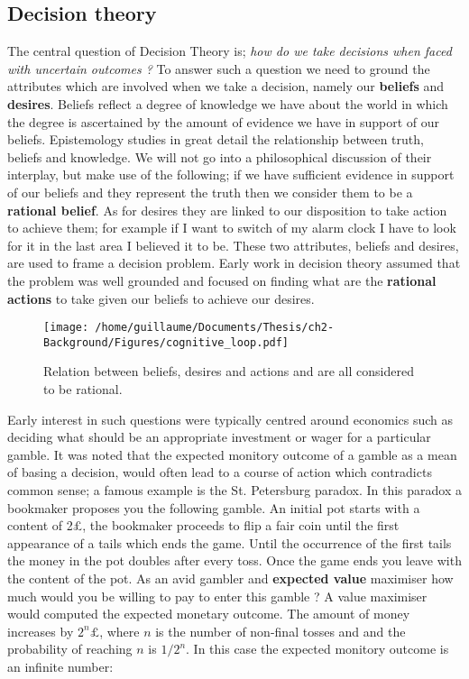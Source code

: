 \subsection{Decision theory}

The central question of Decision Theory is; \textit{how do we take decisions when faced with uncertain outcomes ?} To answer
such a question we need to ground the attributes which are involved when we take a decision, namely our \textbf{beliefs} and 
\textbf{desires}. Beliefs reflect a degree of knowledge we have about the world in which the degree is ascertained by 
the amount of evidence we have in support of our beliefs. Epistemology studies in great detail the relationship between 
truth, beliefs and knowledge. We will not go into a philosophical discussion of their interplay, but make use of the following; 
if we have sufficient evidence in support of our beliefs and they represent the truth then we consider them to 
be a \textbf{rational belief}. As for desires they are linked to our disposition to take action to achieve them; for 
example if I want to switch of my alarm clock I have to look for it in the last area I believed it to be. 
These two attributes, beliefs and desires, are used to frame a decision problem. Early work in decision theory assumed 
that the problem was well grounded and focused on finding what are the \textbf{rational actions} to take given our beliefs 
to achieve our desires. 

\begin{figure}
 \centering
 \texttt{[image: /home/guillaume/Documents/Thesis/ch2-Background/Figures/cognitive\_loop.pdf]}
  \caption{Relation between beliefs, desires and actions and are all considered to be rational.}
\end{figure}

Early interest in such questions were typically centred around economics such as deciding what should be an appropriate 
investment or wager for a particular gamble. It was noted that the expected monitory outcome of a gamble as a mean of basing a 
decision, would often lead to a course of action which contradicts common sense; a famous example is the St. Petersburg paradox.
In this paradox a bookmaker proposes you the following gamble. An initial pot starts with a content of 2\pounds, the bookmaker proceeds 
to flip a fair coin until the first appearance of a tails which ends the game. Until the occurrence of the first tails 
the money in the pot doubles after every toss. Once the game ends you leave with the content of the pot. As an avid gambler 
and \textbf{expected value} maximiser how much would you be willing to pay to enter this gamble ? A value maximiser would computed 
the expected monetary outcome. The amount of money increases by $2^{n}\pounds$, where $n$ is the number of non-final tosses and 
and the probability of reaching $n$ is $1/2^{n}$. In this case the expected monitory outcome is an infinite number:

